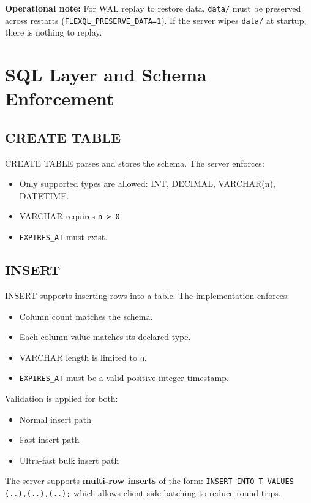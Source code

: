\documentclass[11pt]{article}
\begin{document}
\textbf{Operational note:} For WAL replay to restore data, \texttt{data/} must be preserved across restarts (\texttt{FLEXQL\_PRESERVE\_DATA=1}). If the server wipes \texttt{data/} at startup, there is nothing to replay.

\section{SQL Layer and Schema Enforcement}
\subsection{CREATE TABLE}
CREATE TABLE parses and stores the schema. The server enforces:

\begin{itemize}[leftmargin=*]
\item Only supported types are allowed: INT, DECIMAL, VARCHAR(n), DATETIME.
\item VARCHAR requires \texttt{n > 0}.
\item \texttt{EXPIRES\_AT} must exist.
\end{itemize}

\subsection{INSERT}
INSERT supports inserting rows into a table. The implementation enforces:

\begin{itemize}[leftmargin=*]
\item Column count matches the schema.
\item Each column value matches its declared type.
\item VARCHAR length is limited to \texttt{n}.
\item \texttt{EXPIRES\_AT} must be a valid positive integer timestamp.
\end{itemize}

Validation is applied for both:
\begin{itemize}[leftmargin=*]
\item Normal insert path
\item Fast insert path
\item Ultra-fast bulk insert path
\end{itemize}

The server supports \textbf{multi-row inserts} of the form:
\texttt{INSERT INTO T VALUES (..),(..),(..);}
which allows client-side batching to reduce round trips.
\end{document}
